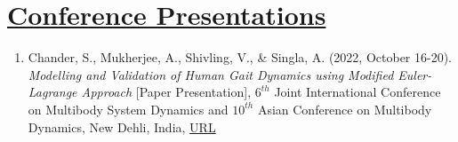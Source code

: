 \section{\underline{Conference Presentations}}
\begin{enumerate}
\item Chander, S., Mukherjee, A., Shivling, V., \& Singla, A. (2022, October 16-20). \emph{Modelling and Validation of Human Gait Dynamics using Modified Euler-Lagrange Approach} [Paper Presentation], $6^{th}$ Joint International Conference on Multibody System Dynamics and $10^{th}$ Asian Conference on Multibody Dynamics, New Dehli, India, \href{http://imsdacmd2020.iitd.ac.in/web-abstracts/pdf/WEB_ABSTRACTS/IMSDACMD2020_219.pdf}{\large{URL}}\\
\end{enumerate}
